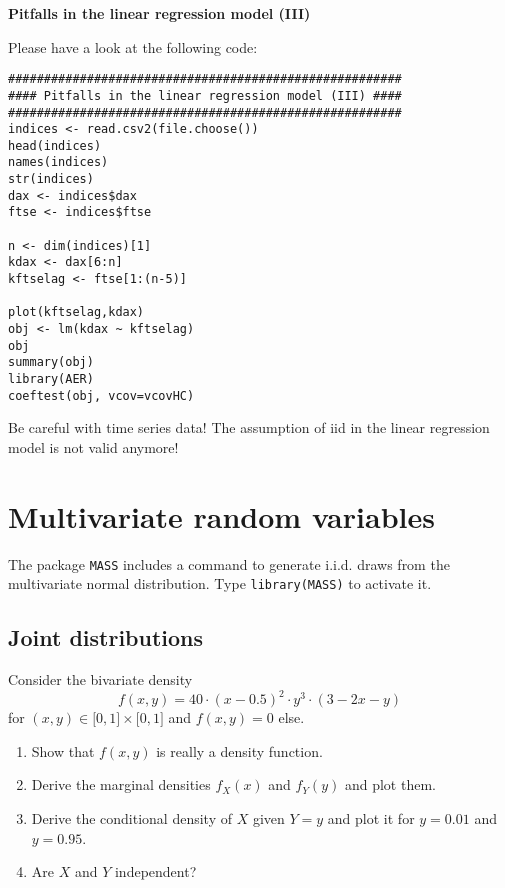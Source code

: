 \documentclass{article}
\begin{document}
\begin{solution}
\textbf{Pitfalls in the linear regression model (III)}

Please have a look at the following code:
\begin{verbatim}
#######################################################
#### Pitfalls in the linear regression model (III) ####
#######################################################
indices <- read.csv2(file.choose())
head(indices)
names(indices)
str(indices)
dax <- indices$dax
ftse <- indices$ftse

n <- dim(indices)[1]
kdax <- dax[6:n]
kftselag <- ftse[1:(n-5)]

plot(kftselag,kdax)
obj <- lm(kdax ~ kftselag)
obj
summary(obj)
library(AER)
coeftest(obj, vcov=vcovHC)
\end{verbatim}
Be careful with time series data! The assumption of iid in the linear regression model is not valid anymore!
\end{solution}
\newpage


\section{Multivariate random variables\label{multivariate}}

The package \texttt{MASS} includes a command to generate i.i.d. draws from
the multivariate normal distribution. Type \texttt{library(MASS)} to
activate it.

\subsection{Joint distributions}

Consider the bivariate density%
\begin{equation*}
f(x,y)=40\cdot \left( x-0.5\right) ^{2}\cdot y^{3}\cdot \left( 3-2x-y\right)
\end{equation*}%
for $(x,y)\in \lbrack 0,1]\times \lbrack 0,1]$ and $f(x,y)=0$ else.

\begin{enumerate}
\item Show that $f(x,y)$ is really a density function.

\item Derive the marginal densities $f_{X}(x)$ and $f_{Y}(y)$ and plot them.

\item Derive the conditional density of $X$ given $Y=y$ and plot it for $%
y=0.01$ and $y=0.95$.

\item Are $X$ and $Y$ independent?
\end{enumerate}
\end{document}
